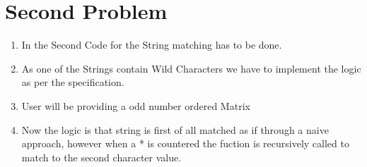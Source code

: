 \documentclass[a4paper,12pt]{report}
\begin{document}
\section*{Second Problem}
\begin{enumerate}

\item In the Second Code for the String matching has to be done. 
\item As one of the Strings contain Wild Characters we have to implement the logic as per the specification. 
\item User will be providing a odd number ordered Matrix
\item Now the logic is that string is first of all matched as if through a naive approach, however when a * is countered the fuction is recursively called to match to the second character value.
\end{enumerate}
\end{document}
